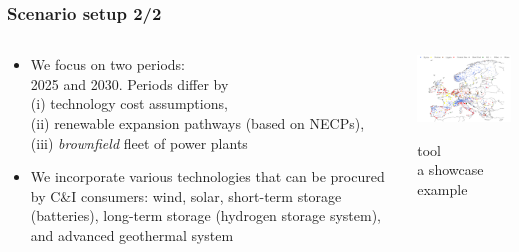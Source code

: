 \begin{frame}
  \frametitle{Scenario setup 2/2}

\begin{columns}[T]
\begin{column}{6cm}

  \begin{itemize}

  \item We focus on two periods: \\ \alert{2025} and \alert{2030}. Periods differ by \\ 
  (i) technology cost assumptions, \\ 
  (ii) renewable expansion pathways (based on NECPs), \\(iii) \emph{brownfield} fleet of power plants
  \item We incorporate various technologies that can be procured by C\&I consumers: wind, solar, short-term storage (batteries), long-term storage (hydrogen storage system), and advanced geothermal system
  \end{itemize}

\end{column}

\begin{column}{8cm}

\centering
\includegraphics[width=8cm]{images/powerplantmatching.png}

\vspace{0.1cm}
 tool \\
a showcase example
\end{column}
\end{columns}

\end{frame}



